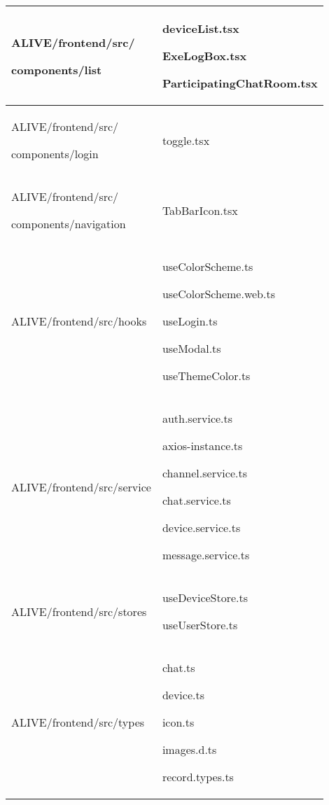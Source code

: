 \documentclass[conference]{IEEEtran}
\begin{document}
\begin{enumerate}
\begin{itemize}
\begin{itemize}
\begin{enumerate}
\begin{table}[h]
\begin{tabular}{|p{3.7cm}|p{4.1cm}|}
          ALIVE/frontend/src/ \par components/list \par  & deviceList.tsx \par ExeLogBox.tsx \par ParticipatingChatRoom.tsx
          \\ \hline
          
          ALIVE/frontend/src/ \par components/login \par  & toggle.tsx
          \\ \hline
          
          ALIVE/frontend/src/ \par components/navigation \par  & TabBarIcon.tsx
          \\ \hline
          
          ALIVE/frontend/src/hooks \par  & useColorScheme.ts \par useColorScheme.web.ts \par useLogin.ts \par useModal.ts \par useThemeColor.ts
          \\ \hline
          
          ALIVE/frontend/src/service \par  & auth.service.ts \par axios-instance.ts \par channel.service.ts \par chat.service.ts \par device.service.ts \par message.service.ts
          \\ \hline
          
          ALIVE/frontend/src/stores \par  &   useDeviceStore.ts \par useUserStore.ts
          \\ \hline
          
          ALIVE/frontend/src/types \par  & chat.ts \par device.ts \par icon.ts \par images.d.ts \par record.types.ts 
          \\ \hline
          

\end{tabular}
\end{table}
\end{enumerate}
\end{itemize}
\end{itemize}
\end{enumerate}
\end{document}
